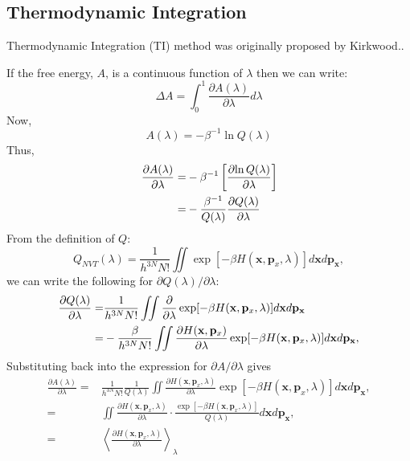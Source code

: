 \subsection{Thermodynamic Integration\label{Sec:FEM:TI}}
Thermodynamic Integration (TI) method was originally proposed by Kirkwood.\cite{KirkwoodJCP1935}. 
	
If the free energy, $A$, is a continuous function of $\lambda$ then we can write:
\begin{equation}
\Delta A = \int_{0}^{1} \frac{\partial{A(\lambda)}}{\partial{\lambda}} d\lambda
\label{Eq:FEM:TI:deltaA1TI}
\end{equation} 
Now,
\begin{equation}
A(\lambda) = -\beta^{-1}\ln Q(\lambda)
\label{Eq:FEM:TI:Alambda}
\end{equation} 
Thus,
\begin{align}
\frac{\partial{A(\lambda)}}{\partial{\lambda}} =& -\beta^{-1} \left[ \frac{\partial{\ln{Q(\lambda)}}}{\partial{\lambda}} \right] \notag\\
=&-\frac{\beta^{-1}}{Q(\lambda)}\frac{\partial{Q(\lambda)}}{\partial{\lambda}}
\label{Eq:FEM:TI:deltaA2TI}
\end{align} 
From the definition of $Q$:
\begin{equation}
Q_{NVT}(\lambda) = \frac{1}{{h}^{3N}N!} \iint \exp[-\beta H(\mathbf{x},\mathbf{p}_{x},\lambda)] d\mathbf{x}d\mathbf{p}_\mathbf{x},
\label{Eq:FEM:TI:PFTI}
\end{equation}
we can write the following for $\partial{Q(\lambda)}/\partial{\lambda}$:
\begin{align}
\frac{\partial{Q(\lambda)}}{\partial{\lambda}} =&\frac{1}{{h}^{3N}N!} \iint \frac{\partial}{\partial{\lambda}}\exp[-\beta H(\mathbf{x},\mathbf{p}_{x},\lambda)] d\mathbf{x}d\mathbf{p}_\mathbf{x}\notag\\
=& -\frac{\beta}{{h}^{3N}N!} \iint \frac{\partial{H(\mathbf{x},\mathbf{p}_{x})}}{\partial{\lambda}}\exp[-\beta H(\mathbf{x},\mathbf{p}_{x},\lambda)] d\mathbf{x}d\mathbf{p}_\mathbf{x},
\label{Eq:FEM:TI:PPF2}
\end{align}
Substituting back into the expression for $\partial{A}/\partial{\lambda}$ gives
\begin{align}
\frac{\partial{A(\lambda)}}{\partial{\lambda}} =& \frac{1}{{h}^{3N}N!}\frac{1}{Q(\lambda)} \iint \frac{\partial{H(\mathbf{x},\mathbf{p}_{x},\lambda)}}{\partial{\lambda}}\exp[-\beta H(\mathbf{x},\mathbf{p}_{x},\lambda)] d\mathbf{x}d\mathbf{p}_\mathbf{x}, \\
=& \iint \frac{\partial{H(\mathbf{x},\mathbf{p}_{x},\lambda)}}{\partial{\lambda}}\cdot\frac{\exp[-\beta H(\mathbf{x},\mathbf{p}_{x},\lambda)]}{Q(\lambda)} d\mathbf{x}d\mathbf{p}_\mathbf{x}, \\
=& \left \langle \frac{\partial{H(\mathbf{x},\mathbf{p}_{x}, \lambda)}}{\partial{\lambda}} \right \rangle_{\lambda}
\label{Eq:FEM:TI:PA2}
\end{align}
